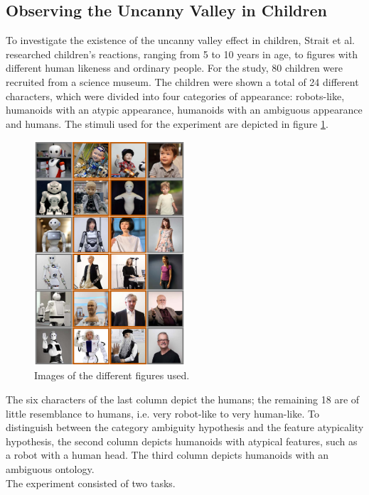 \subsection{Observing the Uncanny Valley in Children}
To investigate the existence of the uncanny valley effect in children, Strait et al. \cite{childrens_responding} researched children's reactions, ranging from 5 to 10 years in age, to figures with different human likeness and ordinary people. For the study, 80 children were recruited from a science museum. The children were shown a total of 24 different characters, which were divided into four categories of appearance: robots-like, humanoids with an atypic appearance, humanoids with an ambiguous appearance and humans. The stimuli used for the experiment are depicted in figure \ref{fig:childrensRespondingAvatars}.
\begin{figure} %
    \centering
    \includegraphics[width=0.5\textwidth]{graphics/childrens_responding_avatars.png}
    \caption{Images of the different figures used.}
    \label{fig:childrensRespondingAvatars}
\end{figure}
The six characters of the last column depict the humans; the remaining 18 are of little resemblance to humans, i.e. very robot-like to very human-like. To distinguish between the category ambiguity hypothesis and the feature atypicality hypothesis, the second column depicts humanoids with atypical features, such as a robot with a human head. The third column depicts humanoids with an ambiguous ontology.\\
The experiment consisted of two tasks.
